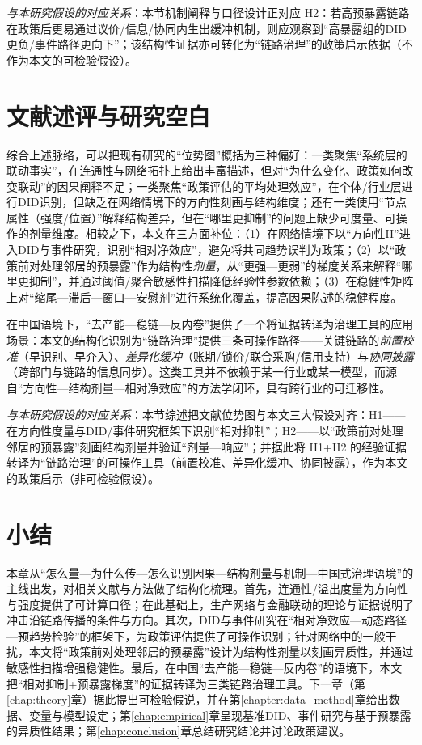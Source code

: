 \noindent\textit{与本研究假设的对应关系}：本节机制阐释与口径设计正对应 H2：若高预暴露链路在政策后更易通过议价/信息/协同内生出缓冲机制，则应观察到“高暴露组的DID更负/事件路径更向下”；该结构性证据亦可转化为“链路治理”的政策启示依据（不作为本文的可检验假设）。
\section{文献述评与研究空白}
综合上述脉络，可以把现有研究的“位势图”概括为三种偏好：一类聚焦“系统层的联动事实”，在连通性与网络拓扑上给出丰富描述，但对“为什么变化、政策如何改变联动”的因果阐释不足；一类聚焦“政策评估的平均处理效应”，在个体/行业层进行DID识别，但缺乏在网络情境下的方向性刻画与结构维度；还有一类使用“节点属性（强度/位置）”解释结构差异，但在“哪里更抑制”的问题上缺少可度量、可操作的剂量维度。相较之下，本文在三方面补位：（1）在网络情境下以“方向性II”进入DID与事件研究，识别“相对净效应”，避免将共同趋势误判为政策；（2）以“政策前对处理邻居的预暴露”作为结构性\emph{剂量}，从“更强—更弱”的梯度关系来解释“哪里更抑制”，并通过阈值/聚合敏感性扫描降低经验性参数依赖；（3）在稳健性矩阵上对“缩尾—滞后—窗口—安慰剂”进行系统化覆盖，提高因果陈述的稳健程度。

在中国语境下，“去产能—稳链—反内卷”提供了一个将证据转译为治理工具的应用场景：本文的结构化识别为“链路治理”提供三条可操作路径——关键链路的\emph{前置校准}（早识别、早介入）、\emph{差异化缓冲}（账期/锁价/联合采购/信用支持）与\emph{协同披露}（跨部门与链路的信息同步）。这类工具并不依赖于某一行业或某一模型，而源自“方向性—结构剂量—相对净效应”的方法学闭环，具有跨行业的可迁移性。

\noindent\textit{与本研究假设的对应关系}：本节综述把文献位势图与本文三大假设对齐：H1——在方向性度量与DID/事件研究框架下识别“相对抑制”；H2——以“政策前对处理邻居的预暴露”刻画结构剂量并验证“剂量—响应”；并据此将 H1+H2 的经验证据转译为“链路治理”的可操作工具（前置校准、差异化缓冲、协同披露），作为本文的政策启示（非可检验假设）。
\section{小结}
本章从“怎么量—为什么传—怎么识别因果—结构剂量与机制—中国式治理语境”的主线出发，对相关文献与方法做了结构化梳理。首先，连通性/溢出度量为方向性与强度提供了可计算口径；在此基础上，生产网络与金融联动的理论与证据说明了冲击沿链路传播的条件与方向。其次，DID与事件研究在“相对净效应—动态路径—预趋势检验”的框架下，为政策评估提供了可操作识别；针对网络中的一般干扰，本文将“政策前对处理邻居的预暴露”设计为结构性剂量以刻画异质性，并通过敏感性扫描增强稳健性。最后，在中国“去产能—稳链—反内卷”的语境下，本文把“相对抑制+预暴露梯度”的证据转译为三类链路治理工具。下一章（第\ref{chap:theory}章）据此提出可检验假说，并在第\ref{chapter:data_method}章给出数据、变量与模型设定；第\ref{chap:empirical}章呈现基准DID、事件研究与基于预暴露的异质性结果；第\ref{chap:conclusion}章总结研究结论并讨论政策建议。